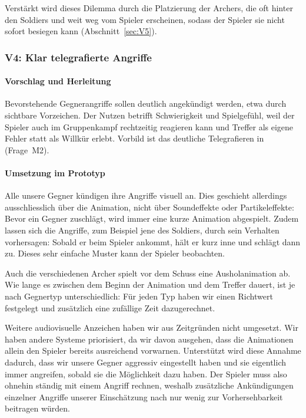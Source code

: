 \documentclass[../Main.tex]{subfiles}
\begin{document}
Verstärkt wird dieses Dilemma durch die Platzierung der Archers, die oft hinter den Soldiers und weit weg vom Spieler erscheinen, sodass der Spieler sie nicht sofort besiegen kann (Abschnitt~\ref{sec:V5}).

\subsubsection{V4: Klar telegrafierte Angriffe} \label{sec:V4}

\paragraph{Vorschlag und Herleitung}
Bevorstehende Gegnerangriffe sollen deutlich angekündigt werden, etwa durch sichtbare Vorzeichen. Der Nutzen betrifft Schwierigkeit und Spielgefühl, weil der Spieler auch im Gruppenkampf rechtzeitig reagieren kann und Treffer als eigene Fehler statt als Willkür erlebt. Vorbild ist das deutliche Telegrafieren in  (Frage~M2).

\paragraph{Umsetzung im Prototyp}
Alle unsere Gegner kündigen ihre Angriffe visuell an. Dies geschieht allerdings ausschliesslich über die Animation, nicht über Soundeffekte oder Partikeleffekte: Bevor ein Gegner zuschlägt, wird immer eine kurze Animation abgespielt. Zudem lassen sich die Angriffe, zum Beispiel jene des Soldiers, durch sein Verhalten vorhersagen: Sobald er beim Spieler ankommt, hält er kurz inne und schlägt dann zu. Dieses sehr einfache Muster kann der Spieler beobachten.

Auch die verschiedenen Archer spielt vor dem Schuss eine Ausholanimation ab. Wie lange es zwischen dem Beginn der Animation und dem Treffer dauert, ist je nach Gegnertyp unterschiedlich: Für jeden Typ haben wir einen Richtwert festgelegt und zusätzlich eine zufällige Zeit dazugerechnet.

Weitere audiovisuelle Anzeichen haben wir aus Zeitgründen nicht umgesetzt. Wir haben andere Systeme priorisiert, da wir davon ausgehen, dass die Animationen allein den Spieler bereits ausreichend vorwarnen. Unterstützt wird diese Annahme dadurch, dass wir unsere Gegner aggressiv eingestellt haben und sie eigentlich immer angreifen, sobald sie die Möglichkeit dazu haben. Der Spieler muss also ohnehin ständig mit einem Angriff rechnen, weshalb zusätzliche Ankündigungen einzelner Angriffe unserer Einschätzung nach nur wenig zur Vorhersehbarkeit beitragen würden.
\end{document}
